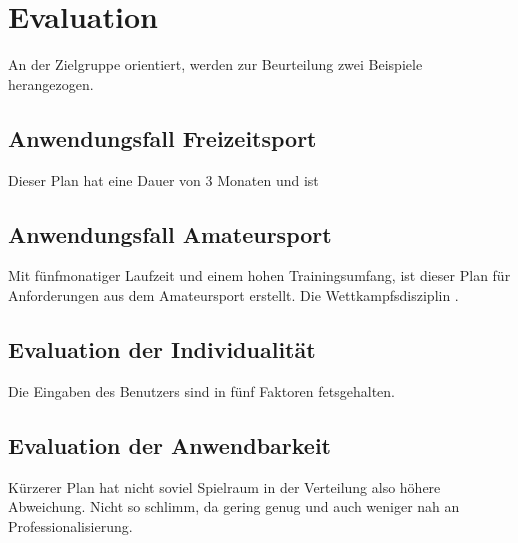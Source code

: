 \chapter{Evaluation}
\label{sec:evaluation}
An der Zielgruppe orientiert, werden zur Beurteilung zwei Beispiele herangezogen.
\section{Anwendungsfall Freizeitsport}
Dieser Plan hat eine Dauer von 3 Monaten und ist 
\section{Anwendungsfall Amateursport}
Mit fünfmonatiger Laufzeit und einem hohen Trainingsumfang, ist dieser Plan für Anforderungen aus dem Amateursport erstellt. Die Wettkampfsdisziplin .


\section{Evaluation der Individualität}
Die Eingaben des Benutzers sind in fünf Faktoren fetsgehalten. 

\section{Evaluation der Anwendbarkeit}
Kürzerer Plan hat nicht soviel Spielraum in der Verteilung also höhere Abweichung. Nicht so schlimm, da gering genug und auch weniger nah an Professionalisierung.
